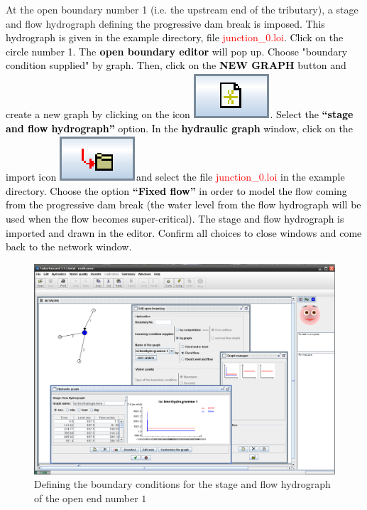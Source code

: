 \documentclass[a4paper,12pt]{article}
\begin{document}
\vspace{0.5cm}

At the open boundary number 1 (i.e. the upstream end of the tributary), a stage and flow hydrograph defining the \textcolor{black}{progressive
dam break is imposed. This hydrograph is given in the example
directory, file }\textcolor{red}{junction\_0.loi}\textcolor{black}{{}. Click on the circle number 1. The}\textbf{\textcolor{black}{{} open boundary editor}}\textcolor{black}{{}
will pop up. Choose "boundary condition supplied" by graph. Then, click on the }\textbf{\textcolor{black}{NEW GRAPH}}\textcolor{black}{{}
button and create a new graph by clicking on the icon \includegraphics[scale=0.6]{new}.
Select the }\textbf{\textcolor{black}{{}``stage and flow hydrograph''}}\textcolor{black}{{}
option. In the }\textbf{\textcolor{black}{hydraulic graph}}\textcolor{black}{{}
window, click on the import icon \includegraphics[scale=0.6]{import}and
select the file }\textcolor{red}{junction\_0.loi}\textcolor{black}{{} in the example
directory. Choose the option }\textbf{\textcolor{black}{{}``Fixed
flow''}}\textcolor{black}{{} in order to model the flow coming from
the progressive dam break (the water level from the flow hydrograph
will be used when the flow becomes super-critical). The stage and flow
hydrograph is imported and drawn in the editor. Confirm all choices
to close windows and come back to the network window.}

\begin{figure}[h]
  \begin{center}
  \includegraphics[scale=0.3]{bcond}
  \caption{Defining the boundary conditions for the stage and flow hydrograph of the open end number $1$}
  \end{center}
\end{figure}
\end{document}

